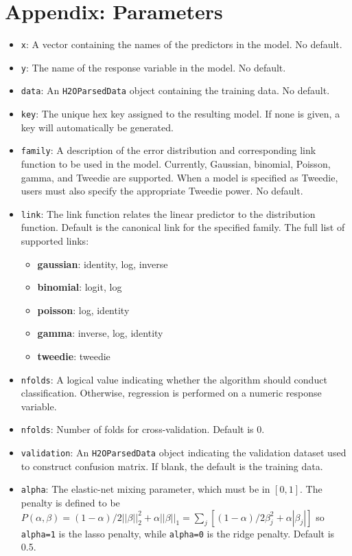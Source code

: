 \documentclass[11pt]{article}
\begin{document}
\section{Appendix: Parameters}
\begin{itemize}
\item \texttt{x}: A vector containing the names of the predictors in the model. No default.
\item \texttt{y}: The name of the response variable in the model. No default.
\item \texttt{data}: An \texttt{H2OParsedData} object containing the training data. No default.
\item \texttt{key}: The unique hex key assigned to the resulting model. If none is given, a key will automatically be generated.
\item \texttt{family}: A description of the error distribution and corresponding link function to be used in the model. Currently, Gaussian, binomial, Poisson, gamma, and Tweedie are supported. When a model is specified as Tweedie, users must also specify the appropriate Tweedie power. No default.
\item \texttt{link}: The link function relates the linear predictor to the distribution function. Default is the canonical link for the specified family. The full list of supported links: 
	\begin{itemize}
\item	{\textbf {gaussian}}: identity, log, inverse 
\item {\textbf{binomial}}: logit, log 
\item {\textbf{poisson}}: log, identity
\item {\textbf{gamma}}: inverse, log, identity
\item {\textbf{tweedie}}: tweedie 
	\end{itemize}
\item \texttt{nfolds}: A logical value indicating whether the algorithm should conduct classification. Otherwise, regression is performed on a numeric response variable.
\item \texttt{nfolds}: Number of folds for cross-validation. Default is 0.
\item \texttt{validation}: An \texttt{H2OParsedData} object indicating the validation dataset used to construct confusion matrix. If  blank, the default is the training data.
\item \texttt{alpha}: The elastic-net mixing parameter, which must be in $[0,1]$. The penalty is defined to be $P(\alpha,\beta) = (1-\alpha)/2||\beta||_2^2 + \alpha||\beta||_1 = \sum_j [(1-\alpha)/2 \beta_j^2 + \alpha|\beta_j|] $ so \texttt{alpha=1} is the lasso penalty, while \texttt{alpha=0} is the ridge penalty. Default is 0.5.

\end{itemize}
\end{document}
